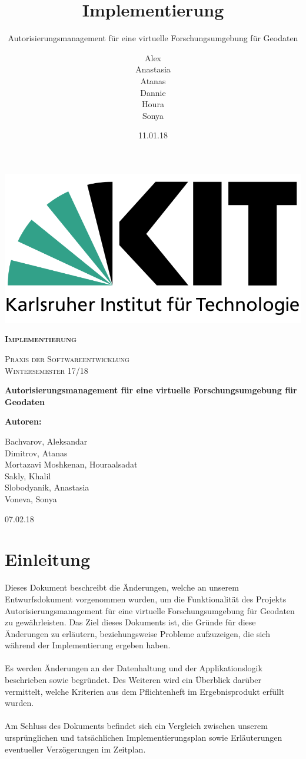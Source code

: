 \documentclass[parskip=full,11pt]{scrartcl}
\title{Implementierung}
\subtitle{Autorisierungsmanagement für eine virtuelle Forschungsumgebung für Geodaten}
\author{Alex\\Anastasia\\Atanas\\Dannie\\ Houra\\Sonya\\}
\date{11.01.18}
\begin{document}
 
 \begin{titlepage}
 	
 	\begin{center}
 	\includegraphics[width=0.5\linewidth]{res/KITLogo.png}\\
 	\vspace{2cm}
 	{\scshape\LARGE\bfseries Implementierung \par}
 	\vspace{0.5cm}
 	{\scshape\Large Praxis der Softwareentwicklung\\}
 	\vspace{1cm}
 	{\scshape\Large Wintersemester 17/18\\}
 	\vspace{2cm}
 	{\huge\bfseries Autorisierungsmanagement für eine virtuelle Forschungsumgebung für Geodaten\par}
 	\vspace{2cm}
 	\vfill
 	{\bfseries {\Large Autoren}:\par}
 	{\Large Bachvarov, Aleksandar }\\
 	{\Large Dimitrov, Atanas }\\
 	{\Large Mortazavi Moshkenan, Houraalsadat }\\
 	{\Large Sakly, Khalil }\\
 	{\Large Slobodyanik, Anastasia }\\
 	{\Large Voneva, Sonya}\\
 	\vfill
 	{\large 07.02.18 \par}
 	\end{center}
 \end{titlepage}
 
 \tableofcontents
 \newpage
 \section{Einleitung}
Dieses Dokument beschreibt die Änderungen, welche an unserem Entwurfsdokument vorgenommen wurden, um die Funktionalität des Projekts 	\glqq Autorisierungsmanagement für eine virtuelle Forschungsumgebung für Geodaten\grqq{} zu gewährleisten. Das Ziel dieses Dokuments ist, die Gründe für diese Änderungen zu erläutern, beziehungsweise Probleme aufzuzeigen, die sich während der Implementierung ergeben haben.\\\\
Es werden Änderungen an der Datenhaltung und der Applikationslogik beschrieben sowie begründet. Des Weiteren wird ein Überblick darüber vermittelt, welche Kriterien aus dem Pflichtenheft im Ergebnisprodukt erfüllt wurden.\\\\
Am Schluss des Dokuments befindet sich ein Vergleich zwischen unserem ursprünglichen und tatsächlichen Implementierungsplan sowie Erläuterungen eventueller Verzögerungen im Zeitplan.
\end{document}
